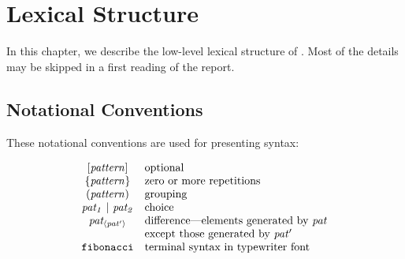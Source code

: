 %
%
\chapter{Lexical Structure}
\label{lexical-structure}



\noindent
In this chapter, 
we describe the low-level lexical structure of \Haskell{}.
Most of the details may be skipped in a first reading of
the report.

\section{Notational Conventions}
\label{notational-conventions}

These notational conventions are used for presenting syntax:

\[\ba{cl}
\mbox{$\it [pattern]$}             & \tr{optional} \\
\mbox{$\it \{pattern\}$}           & \tr{zero or more repetitions} \\
\mbox{$\it (pattern)$}             & \tr{grouping} \\
\mbox{$\it pat_1\ |\ pat_2$}         & \tr{choice} \\
\mbox{$\it pat_{\langle{}pat'\rangle{}}$}  & \tr{difference---elements generated by \mbox{$\it pat$}} \\
                        & \tr{except those generated by \mbox{$\it pat'$}} \\
\mbox{$\it \makebox{\tt fibonacci}$}           & \tr{terminal syntax in typewriter font}
\ea\]

